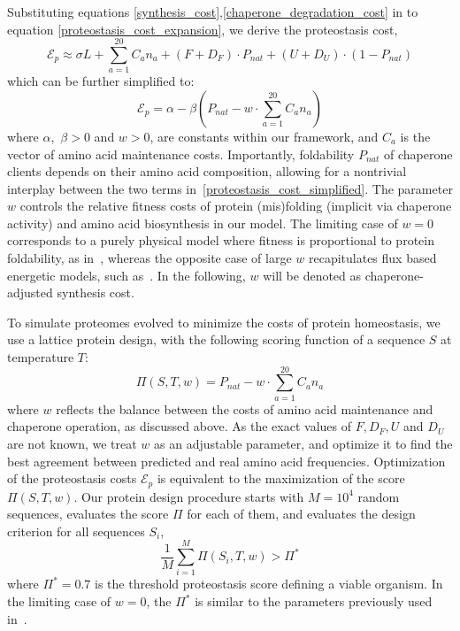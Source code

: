 \documentclass[10pt,letterpaper]{article}
\begin{document}
Substituting equations \eqref{synthesis_cost},\eqref{chaperone_degradation_cost} in to equation \eqref{proteostasis_cost_expansion}, we derive the proteostasis cost, 
\begin{equation}
	\label{proteostasis_cost_detailed}
	\mathcal{E}_{p} \approx \sigma L + \sum\limits_{a=1}^{20}C_{a}n_{a} + (F+D_{F})\cdot P_{nat} + (U+D_{U})\cdot\left(1-P_{nat}\right)
\end{equation}
which can be further simplified to:
\begin{equation}
	\label{proteostasis_cost_simplified}
	\mathcal{E}_{p} = \alpha - \beta\left(P_{nat} - w\cdot\sum\limits_{a=1}^{20}C_{a}n_{a} \right)
\end{equation}
where $\alpha$,\, $\beta > 0$ and $w>0$, are constants within our framework, and $C_{a}$ is the vector of amino acid maintenance costs. Importantly, foldability $P_{nat}$ of chaperone clients depends on their amino acid composition, allowing for a nontrivial interplay between the two terms in~\eqref{proteostasis_cost_simplified}. The parameter $w$ controls the relative fitness costs of protein (mis)folding (implicit via chaperone activity) and amino acid biosynthesis in our model. The limiting case of $w=0$ corresponds to a purely physical model where fitness is proportional to protein foldability, as in~\cite{Taverna2002Why,Bloom2006Protein,Zeldovich2007First,Lobkovsky2010Universal}, whereas the opposite case of large $w$ recapitulates flux based energetic models, such as~\cite{Akashi2002Metabolic,Krick2014Amino,Kepp2014Model}. In the following, $w$ will be denoted as chaperone-adjusted synthesis cost.
 


To simulate proteomes evolved to minimize the costs of protein homeostasis, we use a lattice protein design, with the following scoring function of a sequence $S$ at temperature $T$:
\begin{equation}
	\label{score_proteostasis}
	\Pi(S,T,w) = P_{nat} - w\cdot\sum\limits_{a=1}^{20}C_{a}n_{a}
\end{equation}
where $w$ reflects the balance between the costs of amino acid maintenance and chaperone operation, as discussed above. As the exact values of $F,D_{F},U$ and $D_{U}$ are not known, we treat $w$ as an adjustable parameter, and optimize it to find the best agreement between predicted and real amino acid frequencies. Optimization of the proteostasis costs $\mathcal{E}_{p}$ is equivalent to the maximization of the score $\Pi(S,T,w)$. Our protein design procedure starts with $M=10^{4}$ random sequences, evaluates the score $\Pi$ for each of them, and evaluates the design criterion for all sequences $S_i$,
\begin{equation}
	\label{design_criterion}
	\frac{1}{M}\sum\limits_{i=1}^{M}\Pi(S_{i},T,w) > \Pi^*
\end{equation}
where $\Pi^*=0.7$ is the threshold proteostasis score defining a viable organism. In the limiting case of $w=0$, the $\Pi^*$ is similar to the parameters previously used in~\cite{Zeldovich2007First}. 
\end{document}
